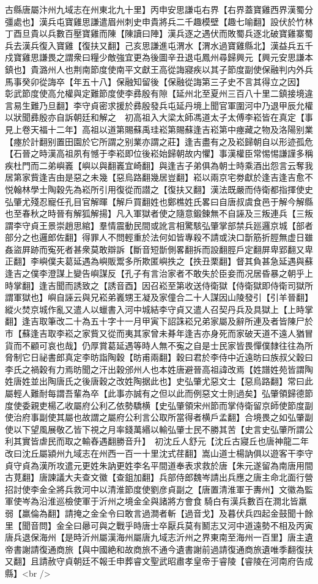 古縣唐屬汴州九域志在州東北九十里】丙申安思謙屯右界【右界蓋寶雞西界漢蜀分彊處也】漢兵屯寶雞思謙遣眉州刺史申貴將兵二千趣模壁【趣七喻翻】設伏於竹林丁酉旦貴以兵數百壓寶雞而陳【陳讀曰陣】漢兵逐之遇伏而敗蜀兵逐北破寶雞寨蜀兵去漢兵復入寶雞【復扶又翻】己亥思謙進屯渭水【渭水過寶雞縣北】漢益兵五千戍寶雞思謙畏之謂衆曰糧少敵強宜更為後圖辛丑退屯鳳州尋歸興元【興元安思謙本鎮也】貴潞州人也荆南節度使南平文獻王高從誨寢疾以其子節度副使保融判内外兵馬事癸卯從誨卒【年五十八】保融知留後【保融從誨第三子史不言其得立之因】　彰武節度使高允權與定難節度使李彞殷有隙【延州北至夏州三百八十里二鎮接境違言易生難乃旦翻】李守貞密求援於彞殷發兵屯延丹境上聞官軍圍河中乃退甲辰允權以狀聞彞殷亦自訴朝廷和解之　初高祖入大梁太師馮道太子太傅李崧皆在真定【事見上卷天福十二年】高祖以道第賜蘇禹珪崧第賜蘇逢吉崧第中瘞藏之物及洛陽别業【瘞於計翻别置田園於它所謂之别業亦謂之莊】逢吉盡有之及崧歸朝自以形迹孤危【石晉之時漢高祖夙有憾于李崧即位後崧始歸朝故内懼】事漢權臣常惕惕謙謹多稱疾杜門而二弟嶼㠖【嶼以與翻㠖宜崎翻】與逢吉子弟俱為朝士時乘酒出怨言云奪我居第家貲逢吉由是惡之未幾【惡烏路翻幾居豈翻】崧以兩京宅劵獻於逢吉逢吉愈不悦翰林學士陶穀先為崧所引用復從而譛之【復扶又翻】漢法既嚴而侍衛都指揮使史弘肇尤殘忍寵任孔目官解暉【解戶買翻姓也鄭樵姓氏畧曰自唐叔虞食邑于解今解縣也至春秋之時晉有解狐解揚】凡入軍獄者使之隨意鍛鍊無不自誣及三叛連兵【三叛謂李守貞王景崇趙思綰】羣情震動民間或訛言相驚駭弘肇掌部禁兵廵邏京城【部者部分之也邏郎佐翻】得罪人不問輕重於法何如皆專殺不請或決口斮筋折脛無虚日雖姦盜屛跡而寃死者甚衆莫敢辯訴【斷音短斮側畧翻拆而設翻脛戶定翻屏卑郢翻又卑正翻】李嶼僕夫葛延遇為嶼販鬻多所欺匿嶼抶之【抶丑栗翻】督其負甚急延遇與蘇逢吉之僕李澄謀上變告嶼謀反【孔子有言治家者不敢失於臣妾而况居昏暴之朝乎上時掌翻】逢吉聞而誘致之【誘音酉】因召崧至第收送侍衛獄【侍衛獄即侍衛司獄所謂軍獄也】嶼自誣云與兄崧弟㠖甥王凝及家僮合二十人謀因山陵發引【引羊晉翻】縱火焚京城作亂又遣人以蠟書入河中城結李守貞又遣人召契丹兵及具獄上【上時掌翻】逢吉取筆改二十為五十字十一月甲寅下詔誅崧兄弟家屬及辭所連及者皆陳尸於市【蘇逢吉取李崧之家貲又從而夷其家曾未朞年逢吉亦身死而家破天道不遠人猶冒貨而不顧可哀也哉】仍厚賞葛延遇等時人無不寃之自是士民家皆畏憚僕隸往往為所脅制它日祕書郎真定李昉詣陶穀【昉甫兩翻】穀曰君於李侍中近遠昉曰族叔父穀曰李氏之禍穀有力焉昉聞之汗出穀邠州人也本姓唐避晉高祖諱改焉【姓譜姓苑皆謂陶姓唐姓並出陶唐氏之後唐穀之改姓陶据此也】史弘肇尤惡文士【惡烏路翻】常曰此屬輕人難耐每謂吾輩為卒【此事亦誠有之但以此而例惡文士則過矣】弘肇領歸德節度使委親吏楊乙收屬府公利乙依勢驕横【史弘肇領宋州節而掌侍衛留京師使節度副使治府事副使其屬也故謂之屬府公利言公取所當得者横戶孟翻】合境畏之如弘肇副使以下望風展敬乙皆下視之月率錢萬緡以輸弘肇士民不勝其苦【史言史弘肇所謂公利其實皆虐民而取之輸舂遇翻勝音升】　初沈丘人舒元【沈丘古寢丘也唐神龍二年改曰沈丘屬潁州九域志在州西一百一十里沈式荏翻】嵩山道士楊訥俱以遊客干李守貞守貞為漢所攻遣元更姓朱訥更姓李名平間道奉表求救於唐【朱元遂留為南唐用間古莧翻】唐諫議大夫查文徽【查鉏加翻】兵部侍郎魏岑請出兵應之唐主命北面行營招討使李金全將兵救河中以清淮節度使劉彦貞副之【唐置清淮軍于夀州】文徽為監軍使岑為沿淮巡檢使軍于沂州之境金全與諸將方會食騎白有漢兵數百在澗北皆羸弱【羸倫為翻】請掩之金全令曰敢言過澗者斬【過音戈】及暮伏兵四起金鼓聞十餘里【聞音問】金全曰曏可與之戰乎時唐士卒厭兵莫有鬭志又河中道遠勢不相及丙寅唐兵退保海州【是時沂州屬漢海州屬唐九域志沂州之界東南至海州一百里】唐主遺帝書謝請復通商旅【與中國絶和故商旅不通今遺書謝前過請復通商旅遺唯季翻復扶又翻】且請赦守貞朝廷不報壬申葬睿文聖武昭肅孝皇帝于睿陵【睿陵在河南府告成縣】<br />
